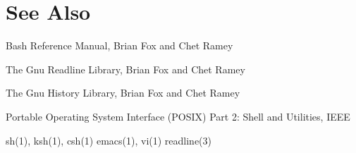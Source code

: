 \section{See Also}\label{sec:seealso}
    Bash Reference Manual, Brian Fox and Chet Ramey
    
    The Gnu Readline Library, Brian Fox and Chet Ramey
    
    The Gnu History Library, Brian Fox and Chet Ramey
    
    Portable Operating System Interface (POSIX) Part 2: Shell and Utilities, IEEE
    
    sh(1), ksh(1), csh(1)
    emacs(1), vi(1)
    readline(3)